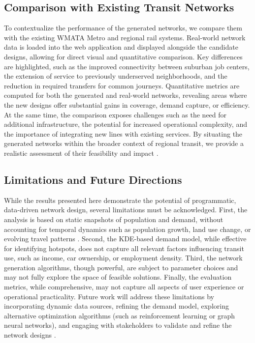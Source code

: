 \documentclass[manuscript]{acmart}
\begin{document}
\subsection{Comparison with Existing Transit Networks}
To contextualize the performance of the generated networks, we compare them with the existing WMATA Metro and regional rail systems. Real-world network data is loaded into the web application and displayed alongside the candidate designs, allowing for direct visual and quantitative comparison. Key differences are highlighted, such as the improved connectivity between suburban job centers, the extension of service to previously underserved neighborhoods, and the reduction in required transfers for common journeys. Quantitative metrics are computed for both the generated and real-world networks, revealing areas where the new designs offer substantial gains in coverage, demand capture, or efficiency. At the same time, the comparison exposes challenges such as the need for additional infrastructure, the potential for increased operational complexity, and the importance of integrating new lines with existing services. By situating the generated networks within the broader context of regional transit, we provide a realistic assessment of their feasibility and impact \cite{bib:overview-field, bib:bast2016route}.

\subsection{Limitations and Future Directions}
While the results presented here demonstrate the potential of programmatic, data-driven network design, several limitations must be acknowledged. First, the analysis is based on static snapshots of population and demand, without accounting for temporal dynamics such as population growth, land use change, or evolving travel patterns \cite{bib:overview-field}. Second, the KDE-based demand model, while effective for identifying hotspots, does not capture all relevant factors influencing transit use, such as income, car ownership, or employment density. Third, the network generation algorithms, though powerful, are subject to parameter choices and may not fully explore the space of feasible solutions. Finally, the evaluation metrics, while comprehensive, may not capture all aspects of user experience or operational practicality. Future work will address these limitations by incorporating dynamic data sources, refining the demand model, exploring alternative optimization algorithms (such as reinforcement learning or graph neural networks), and engaging with stakeholders to validate and refine the network designs \cite{bib:camporeale2016equity}.
\end{document}
